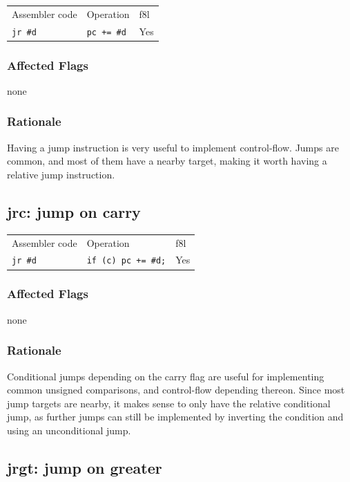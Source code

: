 \documentclass{book}
\begin{document}
\begin{tabular}{l l l}
Assembler code  & Operation          & f8l \\
\texttt{jr \#d} & \texttt{pc += \#d} & Yes \\
\end{tabular}

\subsubsection*{Affected Flags}

none

\subsubsection*{Rationale}

Having a jump instruction is very useful to implement control-flow. Jumps are common, and most of them have a nearby target, making it worth having a relative jump instruction.


\subsection{jrc: jump on carry}

\begin{tabular}{l l l}
Assembler code  & Operation                  & f8l \\
\texttt{jr \#d} & \texttt{if (c) pc += \#d;} & Yes \\
\end{tabular}

\subsubsection*{Affected Flags}

none

\subsubsection*{Rationale}

Conditional jumps depending on the carry flag are useful for implementing common unsigned comparisons, and control-flow depending thereon. Since most jump targets are nearby, it makes sense to only have the relative conditional jump, as further jumps can still be implemented by inverting the condition and using an unconditional jump.


\subsection{jrgt: jump on greater}
\end{document}
